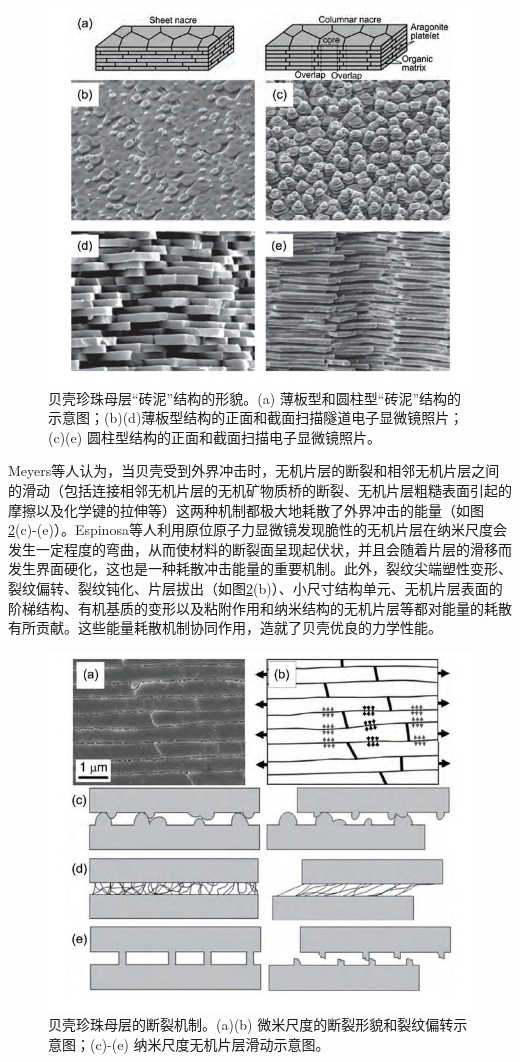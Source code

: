 \documentclass{assignment}
\begin{document}
\begin{da}
    \begin{figure}[H]
        \centering
        \includegraphics[width=.5\columnwidth]{Shell.jpg}
        \caption{贝壳珍珠母层“砖泥”结构的形貌。(a) 薄板型和圆柱型“砖泥”结构的示意图\cite{wang2012layered}；(b)(d)薄板型结构的正面\cite{checa2009key}和截面\cite{barthelat2007mechanics}扫描隧道电子显微镜照片；(c)(e) 圆柱型结构的正面\cite{checa2009key}和截面\cite{rousseau2009dynamics}扫描电子显微镜照片。}
        \label{Shell}
    \end{figure}

    Meyers等人认为，当贝壳受到外界冲击时，无机片层的断裂和相邻无机片层之间的滑动（包括连接相邻无机片层的无机矿物质桥的断裂、无机片层粗糙表面引起的摩擦以及化学键的拉伸等）这两种机制都极大地耗散了外界冲击的能量\cite{meyers2008mechanical}（如图\ref{Shell-2}(c)-(e)）。Espinosa等人利用原位原子力显微镜发现脆性的无机片层在纳米尺度会发生一定程度的弯曲，从而使材料的断裂面呈现起伏状，并且会随着片层的滑移而发生界面硬化，这也是一种耗散冲击能量的重要机制\cite{espinosa2011tablet}。此外，裂纹尖端塑性变形\cite{mayer2002rigid}\cite{rabiei2010failure}、裂纹偏转\cite{wang1995observations}\cite{wagner1992relationship}\cite{xia2015nanoasperity}、裂纹钝化\cite{menig2000quasi}、片层拔出\cite{meyers2013structural}（如图\ref{Shell-2}(b)）、小尺寸结构单元\cite{gao2003materials}、无机片层表面的阶梯结构\cite{katti2005platelet}、有机基质的变形以及粘附作用\cite{menig2000quasi}和纳米结构的无机片层\cite{jackson1988mechanical}等都对能量的耗散有所贡献。这些能量耗散机制协同作用，造就了贝壳优良的力学性能。
    \begin{figure}[H]
        \centering
        \includegraphics[width=.5\columnwidth]{Shell-2.jpg}
        \caption{贝壳珍珠母层的断裂机制。(a)(b) 微米尺度的断裂形貌和裂纹偏转示意图\cite{barthelat2007experimental}；(c)-(e) 纳米尺度无机片层滑动示意图\cite{meyers2008mechanical}。}
        \label{Shell-2}
    \end{figure}
\end{da}
\end{document}
